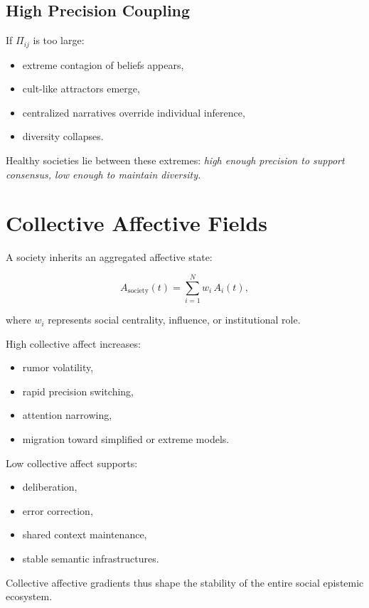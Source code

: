 \documentclass[12pt,oneside]{book}
\theoremstyle{plain}
\theoremstyle{definition}
\begin{document}
\subsection{High Precision Coupling}

If $\Pi_{ij}$ is too large:

\begin{itemize}
    \item extreme contagion of beliefs appears,
    \item cult-like attractors emerge,
    \item centralized narratives override individual inference,
    \item diversity collapses.
\end{itemize}

Healthy societies lie between these extremes:  
\emph{high enough precision to support consensus, low enough to maintain diversity.}

\section{Collective Affective Fields}

A society inherits an aggregated affective state:

\[
A_{\mathrm{society}}(t)
=
\sum_{i=1}^{N} w_i\, A_i(t),
\]

where $w_i$ represents social centrality, influence, or institutional role.

High collective affect increases:

\begin{itemize}
    \item rumor volatility,
    \item rapid precision switching,
    \item attention narrowing,
    \item migration toward simplified or extreme models.
\end{itemize}

Low collective affect supports:

\begin{itemize}
    \item deliberation,
    \item error correction,
    \item shared context maintenance,
    \item stable semantic infrastructures.
\end{itemize}

Collective affective gradients thus shape the stability of the entire social 
epistemic ecosystem.
\end{document}
